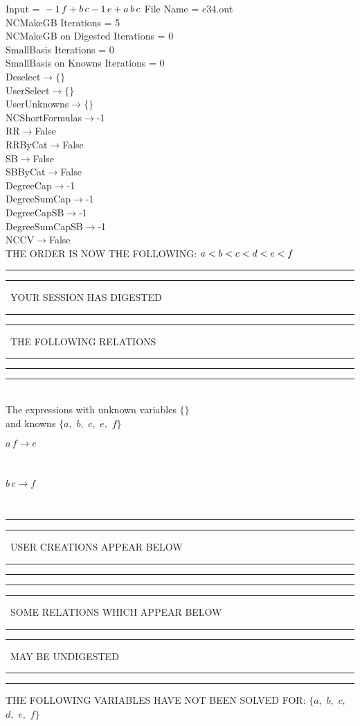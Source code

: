 \documentclass[rep10,leqno]{report}
\begin{document}
\normalsize
\baselineskip=12pt
\noindent
Input = 
$
\\-1\,
 f + b\,
 c\\
-1\,
 e + a\,
 b\,
 c\\
$
File Name = c34.out\\
NCMakeGB Iterations = 5\\
NCMakeGB on Digested Iterations = 0\\
SmallBasis Iterations = 0\\
SmallBasis on Knowns Iterations = 0\\
Deselect$\rightarrow \{\}$\\
UserSelect$\rightarrow \{\}$\\
UserUnknowns$\rightarrow \{\}$\\
NCShortFormulas$\rightarrow$-1\\
RR$\rightarrow $False\\
RRByCat$\rightarrow $False\\
SB$\rightarrow $False\\
SBByCat$\rightarrow $False\\
DegreeCap$\rightarrow $-1\\
DegreeSumCap$\rightarrow $-1\\
DegreeCapSB$\rightarrow $-1\\
DegreeSumCapSB$\rightarrow $-1\\
NCCV$\rightarrow $False\\
THE ORDER IS NOW THE FOLLOWING:\hfil\break
$
a<b<c<d<e<f\\
$
\rule[2pt]{6in}{4pt}\hfil\break
\rule[2pt]{1.879in}{4pt}
\ YOUR SESSION HAS DIGESTED\ 
\rule[2pt]{1.879in}{4pt}\hfil\break
\rule[2pt]{1.923in}{4pt}
\ THE FOLLOWING RELATIONS\ 
\rule[2pt]{1.923in}{4pt}\hfil\break
\rule[2pt]{6in}{4pt}\hfil\break
\rule[3pt]{6in}{.7pt}\\
The expressions with unknown variables $\{\}$\\
and knowns $\{a,
$ $
b,
$ $
c,
$ $
e,
$ $
f\}$\smallskip\\
\begin{minipage}{6in}
$
a\,
 f\rightarrow e
$
\end{minipage}\medskip \\
\begin{minipage}{6in}
$
b\,
 c\rightarrow f
$
\end{minipage}\\
\rule[2pt]{6in}{1pt}\hfil\break
\rule[2.5pt]{1.701in}{1pt}
\ USER CREATIONS APPEAR BELOW\ 
\rule[2.5pt]{1.701in}{1pt}\hfil\break
\rule[2pt]{6in}{1pt}\hfil\break
\rule[2pt]{6in}{4pt}\hfil\break
\rule[2pt]{1.45in}{4pt}
\ SOME RELATIONS WHICH APPEAR BELOW\ 
\rule[2pt]{1.45in}{4pt}\hfil\break
\rule[2pt]{2.18in}{4pt}
\ MAY BE UNDIGESTED\ 
\rule[2pt]{2.18in}{4pt}\hfil\break
\rule[2pt]{6in}{4pt}\hfil\break
THE FOLLOWING VARIABLES HAVE NOT BEEN SOLVED FOR:\hfil\break
$\{a,
$ $
b,
$ $
c,
$ $
d,
$ $
e,
$ $
f\}$
\smallskip\\
\vspace{10pt}
\end{document}
